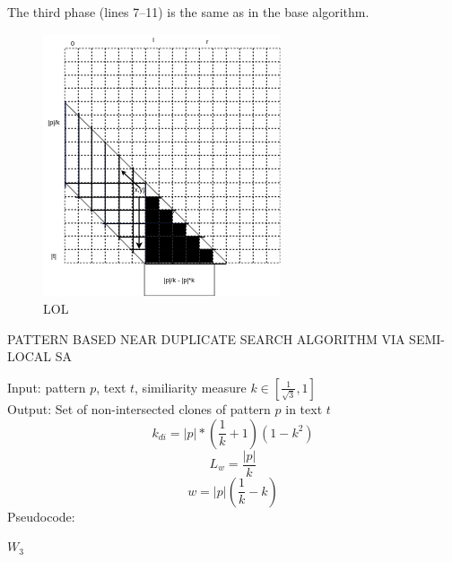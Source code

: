 The third phase (lines 7--11) is the same as in the base algorithm.

 
\begin{figure}
	\centering
   \includegraphics[width=0.4\columnwidth]{figures/M2.png}
   \caption{LOL}\label{M2}
\end{figure}




\begin{algorithm}[!t]
\caption{PATTERN BASED NEAR DUPLICATE
SEARCH ALGORITHM VIA SEMI-LOCAL SA}
\label{alg:patternMathing1}
Input: pattern $p$, text $t$, similiarity measure $k \in  [ \frac{1}{\sqrt{3}} ,1  ]$\\
Output: Set of non-intersected clones of pattern $p$ in text $t$
\begin{equation}
    k_{di}=|p|*(\frac{1}{k}+1)(1-k^2)
\end{equation}
\begin{equation}
 L_{w} = \frac{|p|} {k}
\end{equation}
\begin{equation}
  w = |p|(\frac{1}{k} - k)
\end{equation}
Pseudocode:
\begin{algorithmic}[1]
\ENDIF
\ENDFOR
\RETURN $W_3$
\end{algorithmic}
\end{algorithm}

